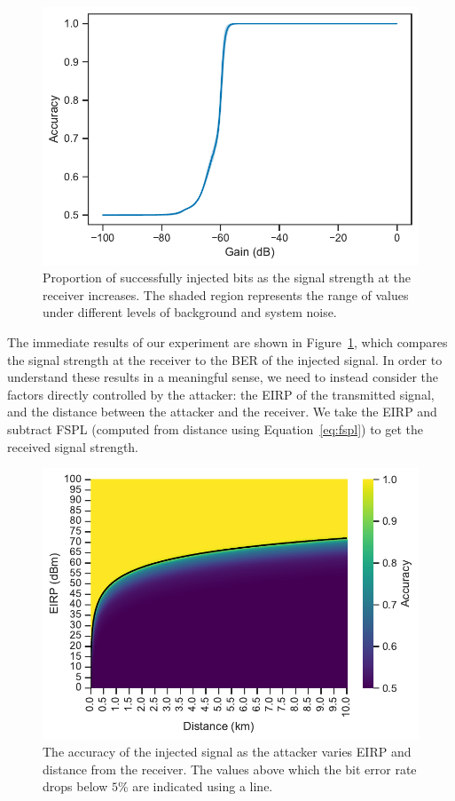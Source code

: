 \begin{figure}
    \centering
    \includegraphics[width=\columnwidth]{diagrams/overshadowing_accuracy.pdf}
    \caption{Proportion of successfully injected bits as the signal strength at the receiver increases. The shaded region represents the range of values under different levels of background and system noise.}
    \label{fig:overshadowing_accuracy}
\end{figure}

The immediate results of our experiment are shown in Figure~\ref{fig:overshadowing_accuracy}, which compares the signal strength at the receiver to the BER of the injected signal.
In order to understand these results in a meaningful sense, we need to instead consider the factors directly controlled by the attacker: the EIRP of the transmitted signal, and the distance between the attacker and the receiver.
We take the EIRP and subtract FSPL (computed from distance using Equation~\ref{eq:fspl}) to get the received signal strength.

\begin{figure}
    \centering
    \includegraphics[width=\columnwidth]{diagrams/distance_eirp_heatmap_95.pdf}
    \caption{The accuracy of the injected signal as the attacker varies EIRP and distance from the receiver. The values above which the bit error rate drops below $5$\% are indicated using a line.}
    \label{fig:distance_eirp}
\end{figure}

